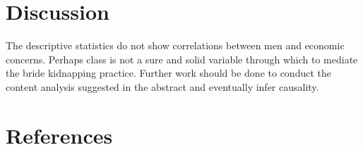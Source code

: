 \documentclass[
  english,
  man]{apa6}
\begin{document}
\hypertarget{discussion}{%
\section{Discussion}\label{discussion}}

The descriptive statistics do not show correlations between men and economic concerns. Perhaps class is not a sure and solid variable through which to mediate the bride kidnapping practice. Further work should be done to conduct the content analysis suggested in the abstract and eventually infer causality.
\newpage

\hypertarget{references}{%
\section{References}\label{references}}

\begingroup
\setlength{\parindent}{-0.5in}
\setlength{\leftskip}{0.5in}
\end{document}
